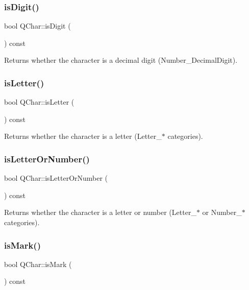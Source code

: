 \subsubsection{\texorpdfstring{isDigit()}{isDigit()}}
{\footnotesize\ttfamily bool Q\+Char\+::is\+Digit (\begin{DoxyParamCaption}{ }\end{DoxyParamCaption}) const}

Returns whether the character is a decimal digit (Number\+\_\+\+Decimal\+Digit). \mbox{\label{class_q_char_aa2d2b13b4b6a3c4343c00d28c58b5529}} 
\subsubsection{\texorpdfstring{isLetter()}{isLetter()}}
{\footnotesize\ttfamily bool Q\+Char\+::is\+Letter (\begin{DoxyParamCaption}{ }\end{DoxyParamCaption}) const}

Returns whether the character is a letter (Letter\+\_\+$\ast$ categories). \mbox{\label{class_q_char_a4307e02d8de59b2a5c4e7a2fc62aa028}} 
\subsubsection{\texorpdfstring{isLetterOrNumber()}{isLetterOrNumber()}}
{\footnotesize\ttfamily bool Q\+Char\+::is\+Letter\+Or\+Number (\begin{DoxyParamCaption}{ }\end{DoxyParamCaption}) const}

Returns whether the character is a letter or number (Letter\+\_\+$\ast$ or Number\+\_\+$\ast$ categories). \mbox{\label{class_q_char_a5b932436088d0aebdeb8d5ec0d13fe54}} 
\subsubsection{\texorpdfstring{isMark()}{isMark()}}
{\footnotesize\ttfamily bool Q\+Char\+::is\+Mark (\begin{DoxyParamCaption}{ }\end{DoxyParamCaption}) const}

